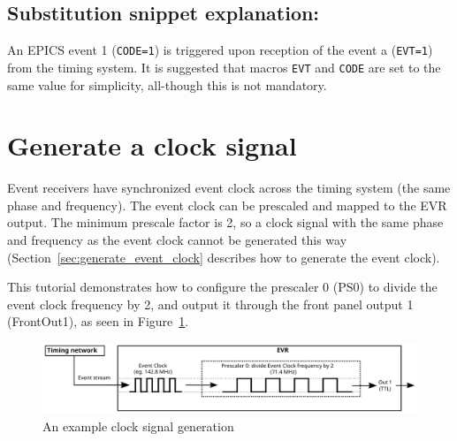 \documentclass[12pt,a4paper]{article}
\begin{document}
\subsection{Substitution snippet explanation:}\label{sec:explain_event}
An EPICS event 1 (\texttt{CODE=1}) is triggered upon reception of the event a (\texttt{EVT=1}) from the timing system.
It is suggested that macros \texttt{EVT} and \texttt{CODE} are set to the same value for simplicity, all-though this is not mandatory.


\section{Generate a clock signal}

Event receivers have synchronized event clock across the timing system (the same phase and frequency). The event clock can be prescaled and mapped to the EVR output. The minimum prescale factor is 2, so a clock signal with the same phase and frequency as the event clock cannot be generated this way (Section~\ref{sec:generate_event_clock} describes how to generate the event clock).

This tutorial demonstrates how to configure the prescaler 0 (PS0) to divide the event clock frequency by 2, and output it through the front panel output 1 (FrontOut1), as seen in Figure~\ref{fig:prescaler}. 

\begin{figure}[H]
	\centering
	\includegraphics[width=\columnwidth]{./img/prescaler}
	\caption{An example clock signal generation}
	\label{fig:prescaler}
\end{figure}
\end{document}
